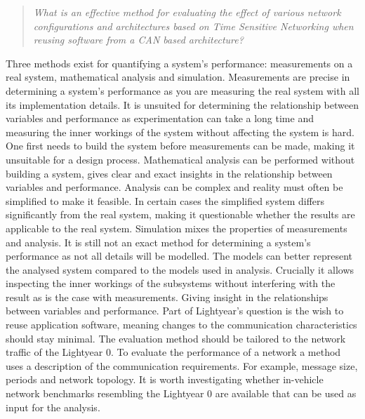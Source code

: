 \begin{quote}
    \emph{What is an effective method for evaluating the effect of various network configurations and architectures based on Time Sensitive Networking when reusing software from a CAN based architecture?}
\end{quote}

Three methods exist for quantifying a system's performance: measurements on a real system, mathematical analysis and simulation. Measurements are precise in determining a system's performance as you are measuring the real system with all its implementation details. It is unsuited for determining the relationship between variables and performance as experimentation can take a long time and measuring the inner workings of the system without affecting the system is hard. One first needs to build the system before measurements can be made, making it unsuitable for a design process. Mathematical analysis can be performed without building a system, gives clear and exact insights in the relationship between variables and performance. Analysis can be complex and reality must often be simplified to make it feasible. In certain cases the simplified system differs significantly from the real system, making it questionable whether the results are applicable to the real system. Simulation mixes the properties of measurements and analysis. It is still not an exact method for determining a system's performance as not all details will be modelled. The models can better represent the analysed system compared to the models used in analysis. Crucially it allows inspecting the inner workings of the subsystems without interfering with the result as is the case with measurements. Giving insight in the relationships between variables and performance. Part of Lightyear's question is the wish to reuse application software, meaning changes to the communication characteristics should stay minimal. The evaluation method should be tailored to the network traffic of the Lightyear 0. To evaluate the performance of a network a method uses a description of the communication requirements. For example, message size, periods and network topology. It is worth investigating whether in-vehicle network benchmarks resembling the Lightyear 0 are available that can be used as input for the analysis.